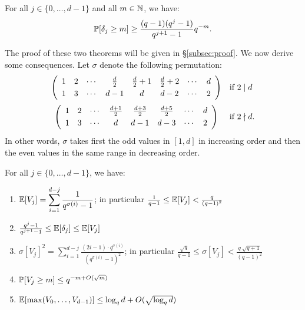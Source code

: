 \documentclass{article}
\begin{document}
\begin{theo}
\label{th:deltaj}
For all $j \in \{0, \ldots, d-1\}$ and all $m \in \N$, we have:
$$\P[\delta_j \geq m] \geq \frac{(q-1)(q^j-1)}{q^{j+1}-1} q^{-m}.$$
\end{theo}

The proof of these two theorems will be given in \S \ref{subsec:proof}. 
We now derive some consequences. Let $\sigma$ denote the following
permutation:
$$\begin{array}{cl}
\left(
\begin{array}{cccccccc}
1 & 2 & \cdots & \frac d 2 & \frac d 2 + 1 & \frac d 2 + 2 & \cdots & d \smallskip \\
1 & 3 & \cdots & d-1 & d & d-2 & \cdots & 2 
\end{array} \right) & \text{if } 2 \mid d \medskip \\
\left(
\begin{array}{cccccccc}
1 & 2 & \cdots & \frac{d+1} 2 & \frac{d+3} 2 & \frac{d+5} 2 & \cdots & d \smallskip \\
1 & 3 & \cdots & d & d-1 & d-3 & \cdots & 2 
\end{array} \right) & \text{if } 2 \nmid d.
\end{array}$$
In other words, $\sigma$ takes first the odd values in $[1,d]$ in 
increasing order and then the even values in the same range in 
decreasing order.

\begin{cor}
\label{cor:Vj}
For all $j \in \{0, \ldots, d-1\}$, we have:

\begin{enumerate}[\hspace{0.3cm}(1)]
\setlength\itemsep{0.1em}
\item $\E[V_j] = 
\displaystyle \sum_{i=1}^{d-j} \frac 1 {q^{\sigma(i)} - 1}$;
in particular $\frac 1 {q-1} \leq \E[V_j] < \frac q {(q-1)^2}$
\item $\frac {q^j - 1}{q^{j+1} - 1} \leq \E[\delta_j] \leq \E[V_j]$
\item $\sigma[V_j]^2 = 
\displaystyle \sum_{i=1}^{d-j} \frac {(2i-1) \cdot q^{\sigma(i)}}
{(q^{\sigma(i)} - 1)^2}$;
in particular $\frac{\sqrt q}{q-1} \leq \sigma[V_j] < 
\frac {q \:\sqrt{q+1}} {(q-1)^2}$
\item $\P[V_j \geq m] \leq q^{-m + O(\sqrt m)}$
\item $\E[\max(V_0, \ldots, V_{d-1})] \leq \log_q d + O(\sqrt{\log_q d})$
\end{enumerate}
\end{cor}
\end{document}
